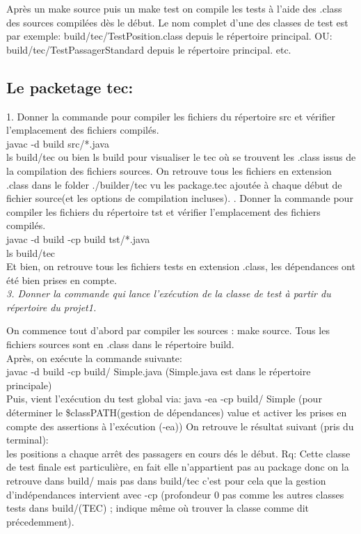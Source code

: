 \documentclass{article}
\begin{document}
Après un make source puis un make test on compile les tests à l’aide des .class des sources compilées dès le début. Le nom complet d’une des classes de test est par exemple:
build/tec/TestPosition.class depuis le répertoire principal.
OU:
build/tec/TestPassagerStandard depuis le répertoire principal.
etc.
\newline 
\newline
\subsection{Le packetage tec: }
1. Donner la commande pour compiler les fichiers du répertoire src et vérifier
l’emplacement des fichiers compilés.\\
javac -d build src/*.java\\
ls build/tec ou bien ls build pour visualiser le tec où se trouvent les .class issus de la compilation des fichiers sources.
On retrouve tous les fichiers en extension .class dans le folder ./builder/tec vu les
package.tec ajoutée à chaque début de fichier source(et les options de compilation
incluses).
. Donner la commande pour compiler les fichiers du répertoire tst et vérifier
l’emplacement des fichiers compilés.\\
javac -d build -cp build tst/*.java\\
ls build/tec\\
Et bien, on retrouve tous les fichiers tests en extension .class, les dépendances ont été bien prises en compte.\\

\textit{3. Donner la commande qui lance l’exécution de la classe de test à partir du répertoire du projet1. }

On commence tout d’abord par compiler les sources : make source. Tous les fichiers
sources sont en .class dans le répertoire build.\\
Après, on exécute la commande suivante:\\
javac -d build -cp build/ Simple.java (Simple.java est dans le répertoire principale)
\\
Puis, vient l'exécution du test global via:
java -ea -cp build/ Simple (pour déterminer le \$classPATH(gestion de dépendances)
value et activer les prises en compte des assertions à l'exécution (-ea))
On retrouve le résultat suivant (pris du terminal):\\
les positions a chaque arrêt des passagers en cours dés le début.\newline
Rq: Cette classe de test finale est particulière, en fait elle n'appartient pas au package donc on la retrouve dans build/ mais pas dans build/tec c'est pour cela que la gestion d'indépendances intervient avec -cp (profondeur 0 pas comme les autres classes tests dans build/(TEC) ; indique même où trouver la classe comme dit précedemment).\\
\\
\\
\end{document}
